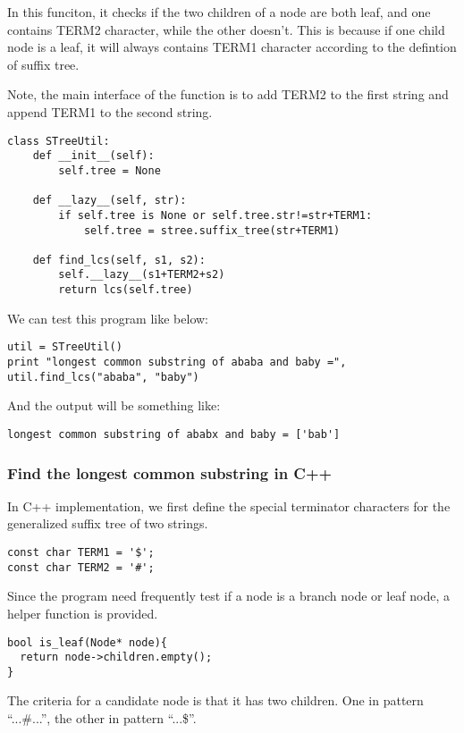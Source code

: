 \documentclass{article}
\begin{document}
In this funciton, it checks if the two children of a node
are both leaf, and one contains TERM2 character, while the 
other doesn't. This is because
if one child node is a leaf, it will always contains TERM1
character according to the defintion of suffix tree.

Note, the main interface of the function is to add TERM2 to 
the first string and append TERM1 to the second string.

\begin{lstlisting}
class STreeUtil:
    def __init__(self):
        self.tree = None

    def __lazy__(self, str):
        if self.tree is None or self.tree.str!=str+TERM1:
            self.tree = stree.suffix_tree(str+TERM1)

    def find_lcs(self, s1, s2):
        self.__lazy__(s1+TERM2+s2)
        return lcs(self.tree)
\end{lstlisting}

We can test this program like below:

\begin{lstlisting}
util = STreeUtil()
print "longest common substring of ababa and baby =", util.find_lcs("ababa", "baby")
\end{lstlisting}

And the output will be something like:
\begin{verbatim}
longest common substring of ababx and baby = ['bab']
\end{verbatim}

\subsubsection*{Find the longest common substring in C++}
In C++ implementation, we first define the special terminator
characters for the generalized suffix tree of two strings.

\lstset{language=C++}
\begin{lstlisting}
const char TERM1 = '$';
const char TERM2 = '#';
\end{lstlisting} %

Since the program need frequently test if a node is a branch
node or leaf node, a helper function is provided.

\begin{lstlisting}
bool is_leaf(Node* node){
  return node->children.empty();
}
\end{lstlisting}

The criteria for a candidate node is that it has two children.
One in pattern ``...\#...'', the other in pattern ``...\$''. 
\end{document}
